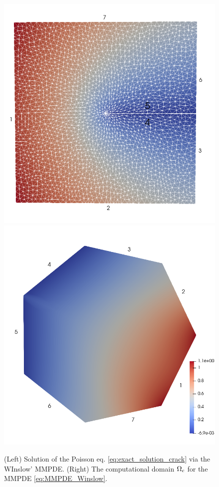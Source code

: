 \documentclass[a4paper,11pt]{article}
\begin{document}
{\begin{figure}[ht]
\centering
\includegraphics[scale=0.17]{Images/Test2/r-adaptive/u_0_99_11862.png}
 \includegraphics[scale=0.17]{Images/Test2/r-adaptive/u_c.png}
\caption{(Left) Solution of the Poisson eq. \ref{eq:exact_solution_crack} via the WInslow' MMPDE. (Right) The computational domain $\Omega_{c}$ for the MMPDE \eqref{eq:MMPDE_Winslow}.}
\end{figure}

}
\end{document}
